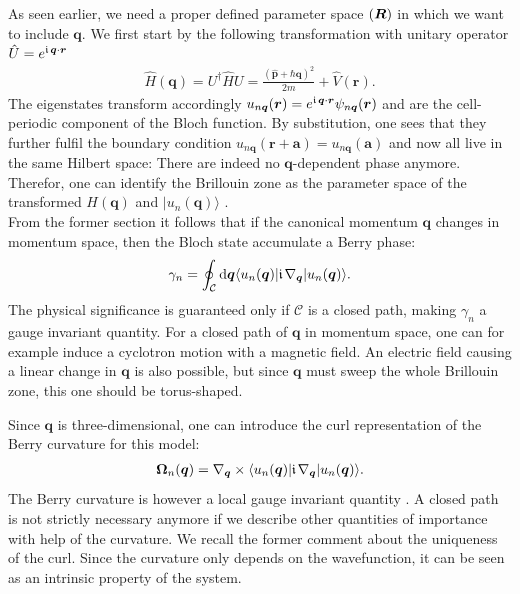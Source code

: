 \documentclass[../main]{subfiles}
\begin{document}
    As seen earlier, we need a proper defined parameter space $(\bm{R})$ in which we want to include $\bm{q}$. We first start by the following  transformation with unitary operator 
    $\hat{U} = e^{\large\mathfrak{i}\hspace*{1.3pt}\normalsize\bm{q}\cdot\bm{r}}$
    \begin{align*}
        \hat{H}(\bm{q}) = U^{\dagger}\hat{H}U = \frac{(\hat{\bm{p}} +\hbar \bm{q})^2}{2m} + \hat{V}(\bm{r}).
    \end{align*}
    The eigenstates transform accordingly $u_{n\bm{q}}(\bm{r})=e^{\large\mathfrak{i}\hspace*{1.3pt}\normalsize\bm{q}\cdot\bm{r}}\psi_{n\bm{q}}(\bm{r})$ and are the cell-periodic component of the Bloch
    function. By substitution, one sees that they further fulfil the boundary condition $u_{n\bm{q}}(\bm{r}+\bm{a}) = u_{n\bm{q}}(\bm{a})$ and now all live in the same Hilbert space:
    There are indeed no $\bm{q}$-dependent phase anymore.  Therefor, one can identify the Brillouin zone as the parameter space of the transformed $H(\bm{q})$ and $|u_n(\bm{q})\rangle$
    \cite{Xiao2010-lt}.\\

    From the former section it follows that if the canonical momentum $\bm{q}$ changes in momentum space, then the Bloch state accumulate a Berry phase:
    \begin{align*}
        \gamma_n = \oint_{\mathcal{C}} \mathrm{d} \bm{q} \langle u_n(\bm{q})|\large\mathfrak{i}\hspace*{1.3pt}\normalsize\nabla_{\bm{q}}|u_n(\bm{q})\rangle.
    \end{align*}
    The physical significance is guaranteed only if $\mathcal{C}$ is a closed path, making $\gamma_n$ a gauge invariant quantity. For a closed path of $\bm{q}$ in momentum space, one can for example induce a cyclotron motion
    with a magnetic field.  An electric field causing a linear change in $\bm{q}$ is also possible, but since $\bm{q}$ must sweep the whole Brillouin zone, this one should be torus-shaped.
    
    Since $\bm{q}$ is three-dimensional, one can introduce the curl representation of the Berry curvature for this model:
    \begin{align*}
        \bm{\Omega}_n (\bm{q}) = \nabla_{\bm{q}} \times \langle u_n(\bm{q})|\large\mathfrak{i}\hspace*{1.3pt}\normalsize\nabla_{\bm{q}}|u_n(\bm{q})\rangle.
    \end{align*} 
    The Berry curvature is however a local gauge invariant quantity \cite{Xiao2010-lt}. A closed path is not strictly necessary anymore if we describe other quantities of importance with help of 
    the curvature. We recall the former comment about the uniqueness of the curl. Since the curvature only depends on the wavefunction, it can be seen as an intrinsic property of the system.\\
\end{document}

